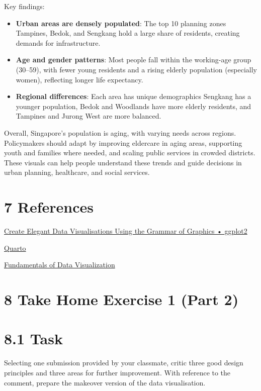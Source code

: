\documentclass[
  letterpaper,
  DIV=11,
  numbers=noendperiod]{scrartcl}
\begin{document}
Key findings:

\begin{itemize}
\item
  \textbf{Urban areas are densely populated}: The top 10 planning zones
  Tampines, Bedok, and Sengkang hold a large share of residents,
  creating demands for infrastructure.
\item
  \textbf{Age and gender patterns}: Most people fall within the
  working-age group (30--59), with fewer young residents and a rising
  elderly population (especially women), reflecting longer life
  expectancy.
\item
  \textbf{Regional differences}: Each area has unique demographics
  Sengkang has a younger population, Bedok and Woodlands have more
  elderly residents, and Tampines and Jurong West are more balanced.
\end{itemize}

Overall, Singapore's population is aging, with varying needs across
regions. Policymakers should adapt by improving eldercare in aging
areas, supporting youth and families where needed, and scaling public
services in crowded districts. These visuals can help people understand
these trends and guide decisions in urban planning, healthcare, and
social services.

\section{7 References}\label{references}

\href{https://ggplot2.tidyverse.org//index.html}{Create Elegant Data
Visualisations Using the Grammar of Graphics • ggplot2}

\href{https://quarto.org/}{Quarto}

\href{https://clauswilke.com/dataviz/}{Fundamentals of Data
Visualization}

\section{8 Take Home Exercise 1 (Part
2)}\label{take-home-exercise-1-part-2}

\section{8.1 Task}\label{task}

Selecting one submission provided by your classmate, critic three good
design principles and three areas for further improvement. With
reference to the comment, prepare the makeover version of the data
visualisation.
\end{document}
